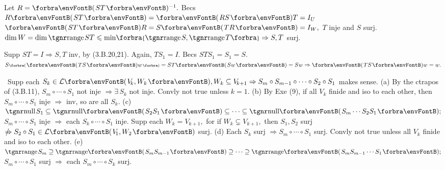 
Let $R=\Par{ST}{^{-1}}.$ Becs $R\Par{ST}=\Par{RS}T=I_U$ \OR $\Par{ST}R=S\Par{TR}=I_W,$ $T$ inje and $S$ surj.\PfEnd\parSol{}
\Or $\dim W=\dim\range ST\leqslant\min\!\Bra{\range S,\range T}\Rightarrow S,T$ surj.\PfEnd
\SepLine

Supp $ST=I\Rightarrow S,T$ inv, by (3.B.20,21). Again, $TS_1=I.$ Becs $STS_1=S_1=S.$\PfEnd\parSol{}
\Or $S\BigPar{\Par{TS}w}=ST\Par{Sw}=Sw\Rightarrow\Par{TS}w=w.$ \;\PfEnd
\SepLine

\BulletPointX{} \,\,\,Supp each $S_k\in\Lm{V_{\!k},W_k},W_k\subseteq V_{\!k+1}\Rightarrow S_m\circ S_{m-1}\circ\cdots\circ S_2\circ S_1$ makes sense.\TextB{}
(a) By the ctrapos of (3.B.11), $S_m\circ\cdots\circ S_1$ not inje $\Rightarrow\exists\,S_k$ not inje. Convly not true unless $k=1.$\TextB{}
(b) By Exe (9), if all $V_{\!k}$ finide and iso to each other, then $S_m\circ\cdots\circ S_1$ inje $\Rightarrow$ inv, so are all $S_k.$\TextB{}
(c) $\null S_1\subseteq \Null\Par{S_2S_1}\subseteq\cdots\subseteq\Null\Par{S_m\cdots S_2S_1};$ \;$S_m\circ\cdots\circ S_1$ inje $\Rightarrow$ each $S_k\circ\cdots\circ S_1$ inje.\vspace{2pt}\TextB{}
Supp each $W_k=V_{\!k+1},$ for if $W_k\subsetneq V_{\!k+1},$ then $S_1,S_2$ surj $\notRightarrow S_2\circ S_1\in\Lm{V_{\!1},W_2}$ surj.\TextB{}
(d) Each $S_k$ surj $\Rightarrow S_m\circ\cdots\circ S_1$ surj. Convly not true unless all $V_{\!k}$ finide and iso to each other.\TextB{}
(e) $\range S_m\supseteq\Range\Par{S_mS_{m-1}}\supseteq\cdots\supseteq\Range\Par{S_mS_{m-1}\cdots S_1};$ \;$S_m\circ\cdots\circ S_1$ surj $\Rightarrow$ each $S_m\circ\cdots\circ S_k$ surj.
\SepLine


